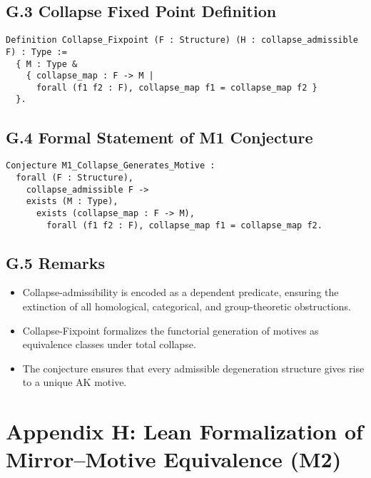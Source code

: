 \documentclass[11pt]{article}
\begin{document}
\subsection*{G.3 Collapse Fixed Point Definition}

\begin{lstlisting}[language=Coq]
Definition Collapse_Fixpoint (F : Structure) (H : collapse_admissible F) : Type :=
  { M : Type &
    { collapse_map : F -> M |
      forall (f1 f2 : F), collapse_map f1 = collapse_map f2 }
  }.
\end{lstlisting}

\subsection*{G.4 Formal Statement of M1 Conjecture}

\begin{lstlisting}[language=Coq]
Conjecture M1_Collapse_Generates_Motive :
  forall (F : Structure),
    collapse_admissible F ->
    exists (M : Type),
      exists (collapse_map : F -> M),
        forall (f1 f2 : F), collapse_map f1 = collapse_map f2.
\end{lstlisting}

\subsection*{G.5 Remarks}

\begin{itemize}
  \item Collapse-admissibility is encoded as a dependent predicate, ensuring the extinction of all homological, categorical, and group-theoretic obstructions.
  \item Collapse-Fixpoint formalizes the functorial generation of motives as equivalence classes under total collapse.
  \item The conjecture ensures that every admissible degeneration structure gives rise to a unique AK motive.
\end{itemize}

\FloatBarrier




\section*{Appendix H: Lean Formalization of Mirror–Motive Equivalence (M2)}
\end{document}
